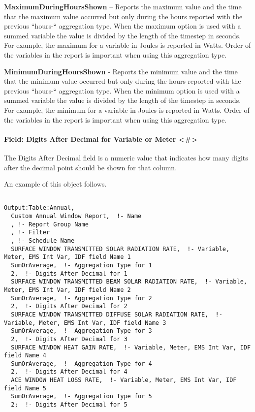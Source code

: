 \textbf{MaximumDuringHoursShown} -- Reports the maximum value and the time that the maximum value occurred but only during the hours reported with the previous ``hours-`` aggregation type. When the maximum option is used with a summed variable the value is divided by the length of the timestep in seconds. For example, the maximum for a variable in Joules is reported in Watts. Order of the variables in the report is important when using this aggregation type.

\textbf{MinimumDuringHoursShown} - Reports the minimum value and the time that the minimum value occurred but only during the hours reported with the previous ``hours-`` aggregation type. When the minimum option is used with a summed variable the value is divided by the length of the timestep in seconds. For example, the minimum for a variable in Joules is reported in Watts. Order of the variables in the report is important when using this aggregation type.

\paragraph{Field: Digits After Decimal for Variable or Meter \textless{}\#\textgreater{}}\label{field-digits-after-decimal-for-variable-or-meter}

The Digits After Decimal field is a numeric value that indicates how many digits after the decimal point should be shown for that column.

An example of this object follows.

\begin{lstlisting}

Output:Table:Annual,
  Custom Annual Window Report,  !- Name
  , !- Report Group Name
  , !- Filter
  , !- Schedule Name
  SURFACE WINDOW TRANSMITTED SOLAR RADIATION RATE,  !- Variable, Meter, EMS Int Var, IDF field Name 1
  SumOrAverage,  !- Aggregation Type for 1
  2,  !- Digits After Decimal for 1
  SURFACE WINDOW TRANSMITTED BEAM SOLAR RADIATION RATE,  !- Variable, Meter, EMS Int Var, IDF field Name 2
  SumOrAverage,  !- Aggregation Type for 2
  2,  !- Digits After Decimal for 2
  SURFACE WINDOW TRANSMITTED DIFFUSE SOLAR RADIATION RATE,  !- Variable, Meter, EMS Int Var, IDF field Name 3
  SumOrAverage,  !- Aggregation Type for 3
  2,  !- Digits After Decimal for 3
  SURFACE WINDOW HEAT GAIN RATE,  !- Variable, Meter, EMS Int Var, IDF field Name 4
  SumOrAverage,  !- Aggregation Type for 4
  2,  !- Digits After Decimal for 4
  ACE WINDOW HEAT LOSS RATE,  !- Variable, Meter, EMS Int Var, IDF field Name 5
  SumOrAverage,  !- Aggregation Type for 5
  2;  !- Digits After Decimal for 5
\end{lstlisting}
